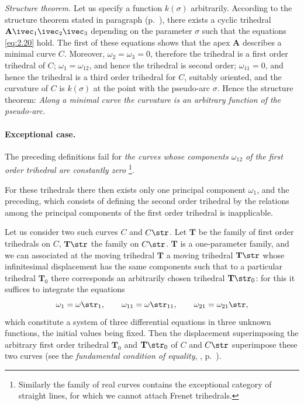 \emph{Structure theorem.} Let us specify a function $k(\sigma)$ arbitrarily. According to the structure theorem stated in paragraph  (p.~\pageref{sec:25}), there exists a cyclic trihedral $\mathbf{A}\ivec_{1}\ivec_{2}\ivec_{3}$ depending on the parameter $\sigma$ such that the equations \eqref{eq:2.20} hold. The first of these equations shows that the apex $\mathbf{A}$ describes a minimal curve $C$. Moreover, $\omega_{2}=\omega_{3}=0$, therefore the trihedral is a first order trihedral of $C$; $\omega_{1}=\omega_{12}$, and hence the trihedral is second order; $\omega_{11}=0$, and hence the trihedral is a third order trihedral for $C$, suitably oriented, and the curvature of $C$ is $k(\sigma)$ at the point with the pseudo-arc $\sigma$. Hence the structure theorem: \emph{Along a minimal curve the curvature is an arbitrary function of the pseudo-arc.}

\paragraph{Exceptional case.}
\label{sec:30}
The preceding definitions fail for \emph{the curves whose components $\omega_{12}$ of the first order trihedral are constantly zero} \footnote{Similarly the family of real curves contains the exceptional category of straight lines, for which we cannot attach Frenet trihedrals.}.

For these trihedrals there then exists only one principal component $\omega_{1}$, and the preceding, which consists of defining the second order trihedral by the relations among the principal components of the first order trihedral is inapplicable.

Let us consider two such curves $C$ and $C\str$. Let $\mathbf{T}$ be the family of first order trihedrals on $C$, $\mathbf{T}\str$ the family on $C\str$. $\mathbf{T}$ is a one-parameter family, and we can associated at the moving trihedral $\mathbf{T}$ a moving trihedral $\mathbf{T}\str$ whose infinitesimal displacement has the same components such that to a particular trihedral $\mathbf{T}_{0}$ there corresponds an arbitrarily chosen trihedral $\mathbf{T}\str_{0}$: for this it suffices to integrate the equations
\[
\omega_{1}=\omega\str_{1},\qquad\omega_{11}=\omega\str_{11},\qquad\omega_{21}=\omega_{21}\str,
\]
which constitute a system of three differential equations in three unknown functions, the initial values being fixed. Then the displacement superimposing the arbitrary first order trihedral $\mathbf{T}_{0}$ and $\mathbf{T}\str_{0}$ of $C$ and $C\str$ superimpose these two curves (see the \emph{fundamental condition of equality}, , p.~\pageref{sec:26}).


